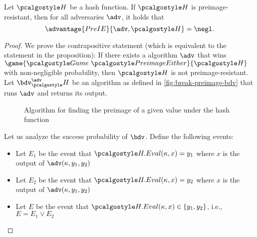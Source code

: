 \begin{proposition}
  Let $\algo{H}$ be a hash function. If $\algo{H}$ is preimage-resistant, then for all \ppt adversaries $\adv$, it holds that
  \[
  \advantage{PreIE}{\adv, \algo{H}} = \negl.
  \]
\end{proposition}
\begin{proof}
  We prove the contrapositive statement (which is equivalent to the statement in the proposition):
  If there exists a \ppt algorithm $\adv$ that wins $\game{\Game~\algo{PreimageEither}}{\algo{H}}$ with non-negligible probability, then $\algo{H}$ is not preimage-resistant.
  Let $\bdv^\adv_\algo{H}$ be an algorithm as defined in \autoref{fig:break-preimage-bdv} that runs $\adv$ and returns its output.
  
  \begin{figure}[tbhp]
  \begin{center}
    \begin{tcolorbox}[width=6cm]
      \begin{pchstack}[center]
      \end{pchstack}
    \end{tcolorbox}
  \end{center}
  \caption{Algorithm for finding the preimage of a given value under the hash function \label{fig:break-preimage-bdv}}
  \end{figure}
  
  Let us analyze the success probability of $\bdv$.
  Define the following events:
  \begin{itemize}
    \item Let $E_1$ be the event that $\algo{H.Eval}(\kappa, x) = y_1$ where $x$ is the output of $\adv(\kappa, y_1, y_2)$
    \item Let $E_2$ be the event that $\algo{H.Eval}(\kappa, x) = y_2$ where $x$ is the output of $\adv(\kappa, y_1, y_2)$
    \item Let $E$ be the event that $\algo{H.Eval}(\kappa, x) \in \{y_1, y_2\}$, i.e., $E = E_1 \vee E_2$
  \end{itemize}
  

\end{proof}

